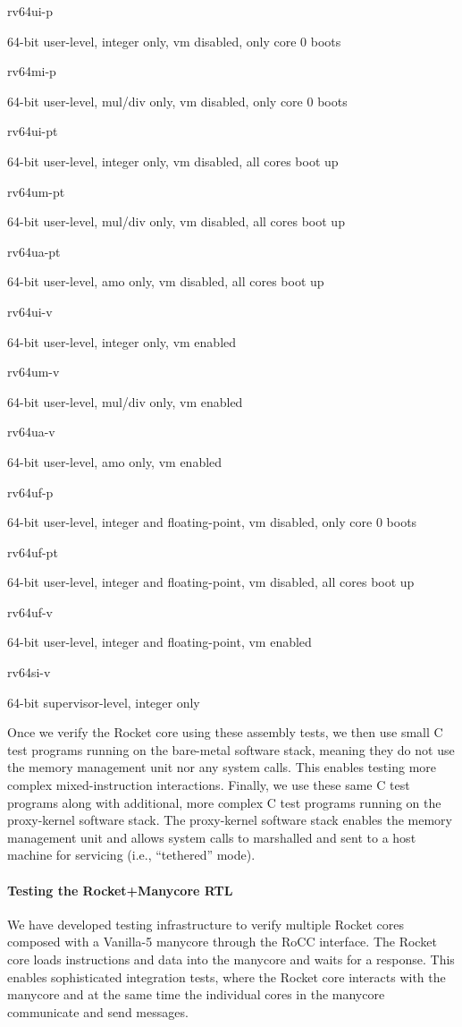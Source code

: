 \smallskip
\begin{cbxlist}{1.5em}{0em}{0em}
  \item \parbox{0.7in}{rv64ui-p}  64-bit user-level, integer only, vm disabled, only core 0 boots
  \item \parbox{0.7in}{rv64mi-p}  64-bit user-level, mul/div only, vm disabled, only core 0 boots
  \item \parbox{0.7in}{rv64ui-pt} 64-bit user-level, integer only, vm disabled, all cores boot up
  \item \parbox{0.7in}{rv64um-pt} 64-bit user-level, mul/div only, vm disabled, all cores boot up
  \item \parbox{0.7in}{rv64ua-pt} 64-bit user-level, amo only, vm disabled, all cores boot up
  \item \parbox{0.7in}{rv64ui-v}  64-bit user-level, integer only, vm enabled
  \item \parbox{0.7in}{rv64um-v}  64-bit user-level, mul/div only, vm enabled
  \item \parbox{0.7in}{rv64ua-v}  64-bit user-level, amo only, vm enabled
  \item \parbox{0.7in}{rv64uf-p}  64-bit user-level, integer and floating-point, vm disabled, only core 0 boots
  \item \parbox{0.7in}{rv64uf-pt} 64-bit user-level, integer and floating-point, vm disabled, all cores boot up
  \item \parbox{0.7in}{rv64uf-v}  64-bit user-level, integer and floating-point, vm enabled
  \item \parbox{0.7in}{rv64si-v}  64-bit supervisor-level, integer only
\end{cbxlist}
\smallskip

Once we verify the Rocket core using these assembly tests, we then use
small C test programs running on the bare-metal software stack, meaning
they do not use the memory management unit nor any system calls. This
enables testing more complex mixed-instruction interactions. Finally, we
use these same C test programs along with additional, more complex C test
programs running on the proxy-kernel software stack. The proxy-kernel
software stack enables the memory management unit and allows system calls
to marshalled and sent to a host machine for servicing (i.e.,
``tethered'' mode).

\paragraph{Testing the Rocket+Manycore RTL}
We have developed testing infrastructure to verify multiple Rocket cores
composed with a Vanilla-5 manycore through the RoCC interface. The Rocket
core loads instructions and data into the manycore and waits for a
response. This enables sophisticated integration tests, where the Rocket
core interacts with the manycore and at the same time the individual
cores in the manycore communicate and send messages.

